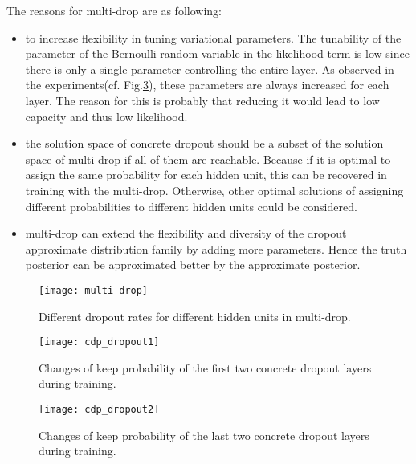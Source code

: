 The reasons for multi-drop are as following:
\begin{itemize}
	\item to increase flexibility in tuning variational parameters. The tunability of the parameter of the Bernoulli random variable in the likelihood term is low since there is only a single parameter controlling the entire layer. As observed in the experiments(cf. Fig.\ref{fig:cdp_dropout2}), these parameters are always increased for each layer. The reason for this is probably that reducing it would lead to low capacity and thus low likelihood. 
	
	\item the solution space of concrete dropout should be a subset of the solution space of multi-drop if all of them are reachable. Because if it is optimal to assign the same probability for each hidden unit, this can be recovered in training with the multi-drop. Otherwise, other optimal solutions of assigning different probabilities to different hidden units could be considered.
	
	\item multi-drop can extend the flexibility and diversity of the dropout approximate distribution family by adding more parameters. Hence the truth posterior can be approximated better by the approximate posterior.
	
\end{itemize}

\begin{figure}
	\begin{center}
		\centering
		\texttt{[image: multi-drop]}
		\caption{Different dropout rates for different hidden units in multi-drop.}		
		\label{fig:multi-drop}
	\end{center}
\end{figure}

\begin{figure}[H]
	\begin{center}
		\texttt{[image: cdp\_dropout1]}	
		\caption{Changes of keep probability of the first two concrete dropout layers during training.}
		\label{fig:cdp_dropout1}
	\end{center}
\end{figure}
\begin{figure}[H]
	\begin{center}
		\texttt{[image: cdp\_dropout2]}	
		\label{fig:cdp_dropout2}
		\caption{Changes of keep probability of the last two concrete dropout layers during training.}
	\end{center}
\end{figure}



